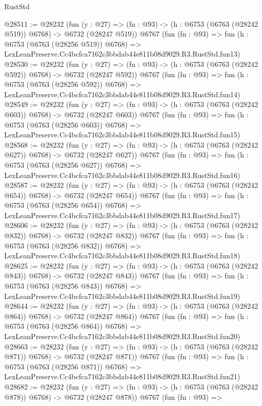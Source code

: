 \begin{lexlean}{RustStd}
\begin{coremodule}
@28511 := @28232
    (fun (y : @27) => (fn : @93) -> (h : @6753 (@6763 (@28242 @519)) @6768) -> @6732 (@28247 @519))
    @6767
    (fun (fn : @93) =>
    fun (h : @6753 (@6763 (@28256 @519)) @6768) =>
    LexLeanPreserve.Cc4bcfca7162c3bbdab44e811b08d9029.R3.RustStd.fun13)
@28530 := @28232
    (fun (y : @27) => (fn : @93) -> (h : @6753 (@6763 (@28242 @592)) @6768) -> @6732 (@28247 @592))
    @6767
    (fun (fn : @93) =>
    fun (h : @6753 (@6763 (@28256 @592)) @6768) =>
    LexLeanPreserve.Cc4bcfca7162c3bbdab44e811b08d9029.R3.RustStd.fun14)
@28549 := @28232
    (fun (y : @27) => (fn : @93) -> (h : @6753 (@6763 (@28242 @603)) @6768) -> @6732 (@28247 @603))
    @6767
    (fun (fn : @93) =>
    fun (h : @6753 (@6763 (@28256 @603)) @6768) =>
    LexLeanPreserve.Cc4bcfca7162c3bbdab44e811b08d9029.R3.RustStd.fun15)
@28568 := @28232
    (fun (y : @27) => (fn : @93) -> (h : @6753 (@6763 (@28242 @627)) @6768) -> @6732 (@28247 @627))
    @6767
    (fun (fn : @93) =>
    fun (h : @6753 (@6763 (@28256 @627)) @6768) =>
    LexLeanPreserve.Cc4bcfca7162c3bbdab44e811b08d9029.R3.RustStd.fun16)
@28587 := @28232
    (fun (y : @27) => (fn : @93) -> (h : @6753 (@6763 (@28242 @654)) @6768) -> @6732 (@28247 @654))
    @6767
    (fun (fn : @93) =>
    fun (h : @6753 (@6763 (@28256 @654)) @6768) =>
    LexLeanPreserve.Cc4bcfca7162c3bbdab44e811b08d9029.R3.RustStd.fun17)
@28606 := @28232
    (fun (y : @27) => (fn : @93) -> (h : @6753 (@6763 (@28242 @832)) @6768) -> @6732 (@28247 @832))
    @6767
    (fun (fn : @93) =>
    fun (h : @6753 (@6763 (@28256 @832)) @6768) =>
    LexLeanPreserve.Cc4bcfca7162c3bbdab44e811b08d9029.R3.RustStd.fun18)
@28625 := @28232
    (fun (y : @27) => (fn : @93) -> (h : @6753 (@6763 (@28242 @843)) @6768) -> @6732 (@28247 @843))
    @6767
    (fun (fn : @93) =>
    fun (h : @6753 (@6763 (@28256 @843)) @6768) =>
    LexLeanPreserve.Cc4bcfca7162c3bbdab44e811b08d9029.R3.RustStd.fun19)
@28644 := @28232
    (fun (y : @27) => (fn : @93) -> (h : @6753 (@6763 (@28242 @864)) @6768) -> @6732 (@28247 @864))
    @6767
    (fun (fn : @93) =>
    fun (h : @6753 (@6763 (@28256 @864)) @6768) =>
    LexLeanPreserve.Cc4bcfca7162c3bbdab44e811b08d9029.R3.RustStd.fun20)
@28663 := @28232
    (fun (y : @27) => (fn : @93) -> (h : @6753 (@6763 (@28242 @871)) @6768) -> @6732 (@28247 @871))
    @6767
    (fun (fn : @93) =>
    fun (h : @6753 (@6763 (@28256 @871)) @6768) =>
    LexLeanPreserve.Cc4bcfca7162c3bbdab44e811b08d9029.R3.RustStd.fun21)
@28682 := @28232
    (fun (y : @27) => (fn : @93) -> (h : @6753 (@6763 (@28242 @878)) @6768) -> @6732 (@28247 @878))
    @6767
    (fun (fn : @93) =>

\end{coremodule}
\end{lexlean}
